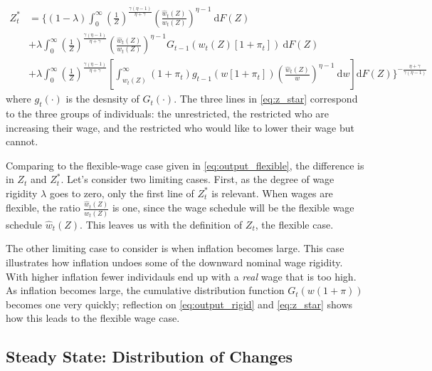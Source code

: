 \documentclass[12pt,a4paper]{scrartcl}            %
\begin{document}
\begin{equation}
    \label{eq:z_star}
    \begin{split}
    Z_t^* &= \Big\{(1 - \lambda) \int_{0}^{\infty} \! \left( \frac{1}{Z} \right)^{\frac{\gamma(\eta - 1)}{\eta + \gamma}} \left( \frac{\hat{w}_t(Z)}{w_t(Z)} \right)^{\eta - 1}\ \mathrm{d}F(Z) \\
          &+            \lambda  \int_{0}^{\infty} \! \left( \frac{1}{Z} \right)^{\frac{\gamma(\eta - 1)}{\eta + \gamma}} \left( \frac{\hat{w}_t(Z)}{w_t(Z)} \right)^{\eta - 1} G_{t-1}\left( w_t(Z)[1 + \pi_t] \right)                                                     \ \mathrm{d}F(Z)\\
          &+            \lambda  \int_{0}^{\infty} \! \left( \frac{1}{Z} \right)^{\frac{\gamma(\eta - 1)}{\eta + \gamma}} \left[ \int_{w_t(Z)}^{\infty} (1 + \pi_t)g_{t-1}\left( w[1 + \pi_t] \right) \left( \frac{\hat{w}_t(Z)}{w} \right)^{\eta - 1}\ \mathrm{d}w \right] \mathrm{d}F(Z)
            \Big\}^{-\frac{\eta + \gamma}{\gamma(\eta - 1)}}
    \end{split}
\end{equation}
%
where $g_t(\cdot)$ is the desnsity of $G_t(\cdot)$.
The three lines in \eqref{eq:z_star} correspond to the three groups of individuals: the unrestricted, the restricted who are increasing their wage, and the restricted who would like to lower their wage but cannot.

Comparing to the flexible-wage case given in \eqref{eq:output_flexible}, the difference is in $Z_t$ and $Z_t^*$.
Let's consider two limiting cases.
First, as the degree of wage rigidity $\lambda$ goes to zero, only the first line of $Z_t^*$ is relevant.
When wages are flexible, the ratio $\frac{\hat{w}_t(Z)}{w_t(Z)}$ is one, since the wage schedule will be the flexible wage schedule $\hat{w}_t(Z)$.  %
This leaves us with the definition of $Z_t$, the flexible case.

The other limiting case to consider is when inflation becomes large.
This case illustrates how inflation undoes some of the downward nominal wage rigidity.
With higher inflation fewer individauls end up with a \emph{real} wage that is too high.
As inflation becomes large, the cumulative distribution function $G_t(w (1 + \pi))$ becomes one very quickly;
reflection on \eqref{eq:output_rigid} and \eqref{eq:z_star} shows how this leads to the flexible wage case.

\subsection{Steady State: Distribution of Changes}
\label{sub:steady_state_distribution_of_changes}
\end{document}
